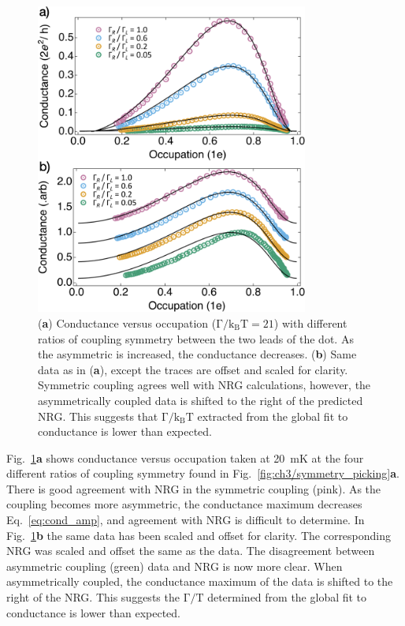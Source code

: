 \begin{figure}[!bht]
 \begin{center}
 \includegraphics[width=0.8\textwidth]{figures/ch3/crop_FiguresMaster.019.png}
 \caption[Conductance vs. Occupation : Varying the coupling symmetry]{\label{fig:ch3/cond_occ_assymetry} 
 (\textbf{a}) Conductance versus occupation ($\mathrm{\Gamma/k_BT=21}$) with different ratios of coupling symmetry between the two leads of the dot. As the asymmetric is increased, the conductance decreases.
 (\textbf{b}) Same data as in (\textbf{a}), except the traces are offset and scaled for clarity. Symmetric coupling agrees well with NRG calculations, however, the asymmetrically coupled data is shifted to the right of the predicted NRG. This suggests that $\mathrm{\Gamma/k_BT}$ extracted from the global fit to conductance is lower than expected.}
 \end{center}
\end{figure}


Fig.~\ref{fig:ch3/cond_occ_assymetry}\textbf{a} shows conductance versus occupation taken at \qty{20}{mK} at the four different ratios of coupling symmetry found in Fig.~\ref{fig:ch3/symmetry_picking}\textbf{a}. There is good agreement with NRG in the symmetric coupling (pink). As the coupling becomes more asymmetric, the conductance maximum decreases Eq.~\ref{eq:cond_amp}, and agreement with NRG is difficult to determine. In Fig.~\ref{fig:ch3/cond_occ_assymetry}\textbf{b} the same data has been scaled and offset for clarity. The corresponding NRG was scaled and offset the same as the data. The disagreement between asymmetric coupling (green) data and NRG is now more clear. When asymmetrically coupled, the conductance maximum of the data is shifted to the right of the NRG. This suggests the $\mathrm{\Gamma/T}$ determined from the global fit to conductance is lower than expected. 

